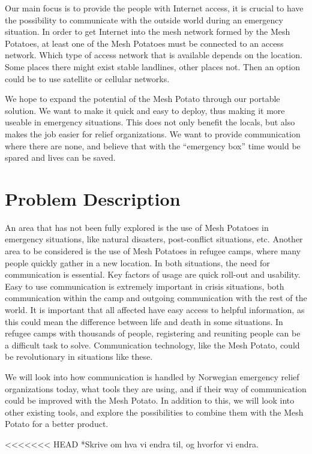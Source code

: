 Our main focus is to provide the people with Internet access, it is crucial to have the possibility to communicate with the outside world during an emergency situation. In order to get Internet into the mesh network formed by the Mesh Potatoes, at least one of the Mesh Potatoes must be connected to an access network. Which type of access network that is available depends on the location. Some places there might exist stable landlines, other places not. Then an option could be to use satellite or cellular networks. 

We hope to expand the potential of the Mesh Potato through our portable solution. We want to make it quick and easy to deploy, thus making it more useable in emergency situations. This does not only benefit the locals, but also makes the job easier for relief organizations. 
We want to provide communication where there are none,  and believe that with the “emergency box” time would be spared and lives can be saved.

\section{Problem Description}
An area that has not been fully explored is the use of Mesh Potatoes in emergency situations, like natural disasters, post-conflict situations, etc. Another area to be considered is the use of Mesh Potatoes in refugee camps, where many people quickly gather in a new location. In both situations, the need for communication is essential. Key factors of usage are quick roll-out and usability. Easy to use communication is extremely important in crisis situations, both communication within the camp and outgoing communication with the rest of the world. It is important that all affected have easy access to helpful information, as this could mean the difference between life and death in some situations. In refugee camps with thousands of people, registering and reuniting people can be a difficult task to solve. Communication technology, like the Mesh Potato, could be revolutionary in situations like these. 

We will look into how communication is handled by Norwegian emergency relief organizations today, what tools they are using, and if their way of communication could be improved with the Mesh Potato. In addition to this, we will look into other existing tools, and explore the possibilities to combine them with the Mesh Potato for a better product. 

<<<<<<< HEAD
*Skrive om hva vi endra til, og hvorfor vi endra. 

